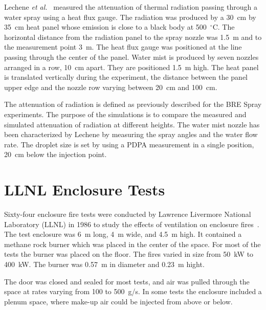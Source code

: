 Lechene {\em et al.}~\cite{Lechene} measured the attenuation of thermal radiation passing through a water
spray using a heat flux gauge. The radiation was produced by a 30~cm by 35~cm heat panel whose emission is close
to a black body at 500~$^\circ$C. The horizontal distance
from the radiation panel to the spray nozzle was 1.5~m and to the measurement point 3~m. The heat flux gauge was positioned at the line passing through the center of the panel.
Water mist is produced by seven nozzles arranged in a row, 10~cm apart. They are positioned 1.5~m high. The heat panel is translated vertically during the experiment,
the distance between the panel upper edge and the nozzle row varying between 20~cm and 100~cm.

The attenuation of radiation is defined as previously described for the BRE Spray experiments.
The purpose of the simulations is to compare the measured and simulated attenuation of radiation at different heights.
The water mist nozzle has been characterized by Lechene by measuring the spray
angles and the water flow rate. The droplet size is set by using a PDPA measurement in a single position, 20~cm below the injection point.


\section{LLNL Enclosure Tests}

Sixty-four enclosure fire tests were conducted by Lawrence Livermore National Laboratory (LLNL) in 1986 to study the effects of ventilation on enclosure fires~\cite{Foote:LLNL1986}. The test
enclosure was 6~m long, 4~m wide, and 4.5~m high. It contained a methane rock burner which was placed in the center of the space. For most of the tests the burner was placed on the
floor. The fires varied in size from 50~kW to 400~kW. The burner was 0.57~m in diameter and 0.23~m hight.

The door was closed and sealed for most tests, and air was pulled through the space at rates varying from 100 to 500~g/s. In some tests the enclosure included a plenum space, where
make-up air could be injected from above or below.

